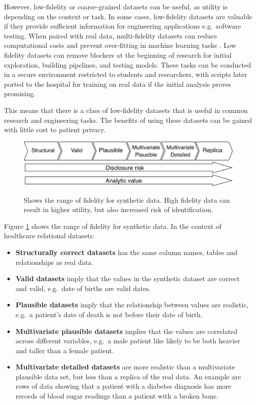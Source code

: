 \documentclass[11pt]{article}
\begin{document}
However, low-fidelity or coarse-grained datasets can be useful, as utility is depending on the context or task. In some cases, low-fidelity datasets are valuable if they provide sufficient information for engineering applications e.g.\ software testing. When paired with real data, multi-fidelity datasets can  reduce computational costs and prevent over-fitting in machine learning tasks \cite{Patra2020}\cite{Santoni2024}\cite{berkson2019}. Low fidelity datasets can remove blockers at the beginning of research for initial exploration, building pipelines, and testing models. These tasks can be conducted in a secure environment restricted to students and researchers, with scripts later ported to the hospital for training on real data if the initial analysis proves promising.

This means that there is a class of low-fidelity datasets that is useful in common research and engineering tasks. The benefits of using these datasets can be gained with little cost to patient privacy. 

\begin{figure}[ht]
\caption{Shows the range of fidelity for synthetic data. High fidelity data can result in higher utility, but also increased risk of identification.}
\centering
\includegraphics[width=0.8\linewidth]{figures/ONS.png}
\label{fig:Range of fidelity for synthetic data}
\end{figure}

Figure \ref{fig:Range of fidelity for synthetic data} shows the range of fidelity for synthetic data. In the context of healthcare relational datasets: 

\begin{itemize}
    \item \textbf{Structurally correct datasets} has the same column names, tables and relationships as real data. 
    \item \textbf{Valid datasets} imply that the values in the synthetic dataset are correct and valid, e.g.\ date of births are valid dates. 
    \item \textbf{Plausible datasets} imply that the relationship between values are realistic, e.g.\ a patient's date of death is not before their date of birth.
    \item \textbf{Multivariate plausible datasets} implies that the values are correlated across different variables, e.g.\ a male patient like likely to be both heavier and taller than a female patient. 
    \item \textbf{Multivariate detailed datasets} are more realistic than a multivariate plausible data set, but less than a replica of the real data. An example are rows of data showing that a patient with a diabetes diagnosis has more records of blood sugar readings than a patient with a broken bone.
\end{itemize}
\end{document}
